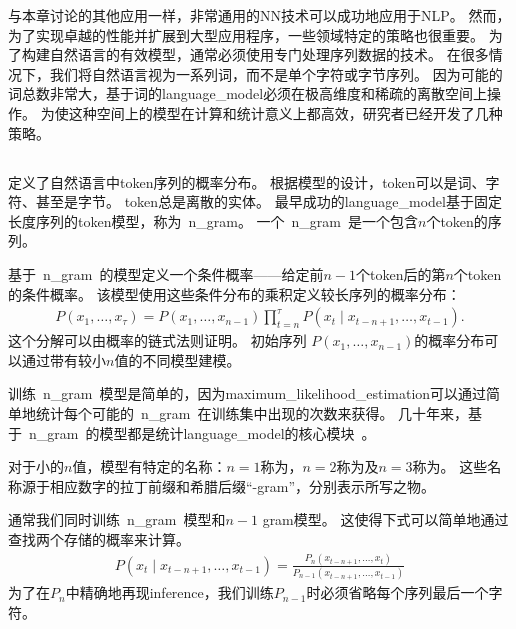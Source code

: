 
与本章讨论的其他应用一样，非常通用的\gls{NN}技术可以成功地应用于\gls{NLP}。
然而，为了实现卓越的性能并扩展到大型应用程序，一些领域特定的策略也很重要。
为了构建自然语言的有效模型，通常必须使用专门处理序列数据的技术。
在很多情况下，我们将自然语言视为一系列词，而不是单个字符或字节序列。
因为可能的词总数非常大，基于词的\gls{language_model}必须在极高维度和稀疏的离散空间上操作。
为使这种空间上的模型在计算和统计意义上都高效，研究者已经开发了几种策略。

\subsection{}
\label{sec:n_grams}

定义了自然语言中\gls{token}序列的概率分布。
根据模型的设计，\gls{token}可以是词、字符、甚至是字节。
\gls{token}总是离散的实体。
最早成功的\gls{language_model}基于固定长度序列的\gls{token}模型，称为~\gls{n_gram}。
一个~\gls{n_gram}~是一个包含$n$个\gls{token}的序列。


基于~\gls{n_gram}~的模型定义一个条件概率——给定前$n-1$个\gls{token}后的第$n$个\gls{token}的条件概率。
该模型使用这些条件分布的乘积定义较长序列的概率分布：
\begin{align}
P(x_1, \dots, x_\tau) = P(x_1, \dots, x_{n-1}) \prod_{t=n}^\tau P(x_t \mid x_{t-n+1}, \dots, x_{t-1} ).
\end{align}
这个分解可以由概率的链式法则证明。
初始序列 $P(x_1, \dots, x_{n-1})$的概率分布可以通过带有较小$n$值的不同模型建模。

训练~\gls{n_gram}~模型是简单的，因为\gls{maximum_likelihood_estimation}可以通过简单地统计每个可能的~\gls{n_gram}~在训练集中出现的次数来获得。                                   
几十年来，基于~\gls{n_gram}~的模型都是统计\gls{language_model}的核心模块~\citep{Jelinek+Mercer80,Katz87,Chen+Goodman99}。

对于小的$n$值，模型有特定的名称：$n=1$称为，$n=2$称为及$n=3$称为。
这些名称源于相应数字的拉丁前缀和希腊后缀``-gram''，分别表示所写之物。


通常我们同时训练~\gls{n_gram}~模型和$n-1$ gram模型。 
这使得下式可以简单地通过查找两个存储的概率来计算。
\begin{align}
\label{eq:ml-ngram}
P(x_t \mid x_{t-n+1}, \dots, x_{t-1}) = \frac{P_n(x_{t-n+1}, \dots, x_t)} { P_{n-1}( x_{t-n+1}, \dots, x_{t-1}) }
\end{align}
为了在$P_n$中精确地再现\gls{inference}，我们训练$P_{n-1}$时必须省略每个序列最后一个字符。

